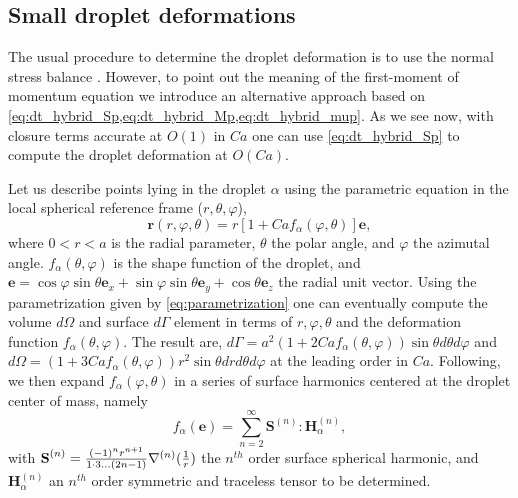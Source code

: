 \subsection{Small droplet deformations}

The usual procedure to determine the droplet deformation is to use the normal stress balance \citep{nadim1991motion,nadim1996concise}. 
However, to point out the meaning of the first-moment of momentum equation we introduce an alternative approach based on \ref{eq:dt_hybrid_Sp,eq:dt_hybrid_Mp,eq:dt_hybrid_mup}. 
As we see now, with closure terms accurate at $O(1)$ in $Ca$ one can use \ref{eq:dt_hybrid_Sp} to compute the droplet deformation at $O(Ca)$. 

Let us describe points lying in the droplet $\alpha$ using the parametric equation in the local spherical reference frame ($r,\theta,\varphi$),
\begin{equation}
    \textbf{r}(r,\varphi,\theta) = r [1+ Ca f_\alpha(\varphi,\theta)] \textbf{e},
    \label{eq:parametrization}
\end{equation}
where $0<r<a$ is the radial parameter, $\theta$ the polar angle, and $\varphi$ the azimutal angle. 
$f_\alpha(\theta,\varphi)$ is the shape function of the droplet, and $\textbf{e} = \cos\varphi\sin\theta \textbf{e}_x + \sin\varphi\sin\theta\textbf{e}_y+ \cos\theta \textbf{e}_z$ the radial unit vector. 
Using the parametrization given by \ref{eq:parametrization} one can eventually compute the volume $d\Omega$ and surface $d\Gamma$ element in terms of $r,\varphi,\theta$ and the deformation function $f_\alpha(\theta,\varphi)$.
The result are, $d\Gamma =a^2 (1+2Ca f_\alpha(\theta,\varphi)) \sin\theta d\theta d\varphi$ and $d\Omega = (1+3Ca f_\alpha(\theta,\varphi)) r^2\sin\theta drd\theta d\varphi$ at the leading order in $Ca$. 
Following, \citet{nadim1996concise,nadim1991motion} we then expand $f_\alpha(\varphi,\theta)$ in a series of surface harmonics centered at the droplet center of mass, namely 
\begin{equation}
    f_\alpha(\textbf{e}) = 
    \sum_{n=2}^\infty\textbf{S}^{(n)}:\textbf{H}_\alpha^{(n)},
    \label{eq:f_definition}
\end{equation} 
with $\textbf{S}^{(n)} = \frac{(-1)^n r^{n+1}}{1\cdot3\ldots(2n-1)}\mathbf{\nabla}^{(n)}(\frac{1}{r})$ the $n^{th}$ order surface spherical harmonic, and $\textbf{H}_\alpha^{(n)}$ an $n^{th}$ order symmetric and traceless tensor to be determined. 

